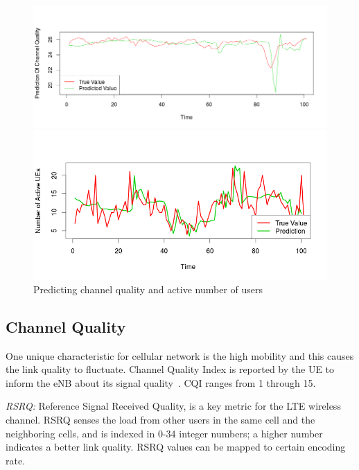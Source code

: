 \begin{figure}[t]

\begin{minipage} {\linewidth}
\centering
 \includegraphics[width=\linewidth]{pictures/prediction.png}
\end{minipage}
\hspace{0.5cm}
\begin{minipage} {\linewidth}
\centering
 \includegraphics[width=\linewidth]{pictures/UE.png}
\end{minipage}

\caption{Predicting channel quality and active number of users} \label{fig:prediction}
\end{figure}

\subsection{Channel Quality}\label{subsec:CQ}
One unique characteristic for cellular network is the high mobility and this causes the link quality to fluctuate. Channel Quality Index is reported by the UE to inform the eNB about its signal quality~\cite{cqi}.  CQI ranges from 1 through 15. 

\emph{RSRQ:} Reference Signal Received Quality, is a key metric for the LTE wireless channel. RSRQ senses the load from other users in the same cell and the neighboring cells, and is indexed in 0-34 integer numbers; a higher number indicates a better link quality. RSRQ values can be mapped to certain encoding rate.

